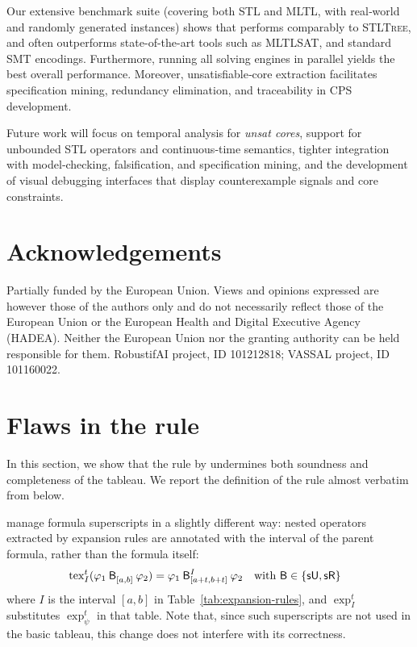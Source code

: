 \documentclass{easychair}
\begin{document}
Our extensive benchmark suite (covering both STL and MLTL, with real‑world and randomly generated instances) shows that \stlsat{} performs comparably to \textsc{STLTree}, and often outperforms state-of-the-art tools such as MLTLSAT, and standard SMT encodings.  
%
Furthermore, running all \stlsat{} solving engines in parallel yields the best overall performance.
Moreover, unsatisfiable‑core extraction facilitates specification mining, redundancy elimination, and traceability in CPS development.

Future work will focus on temporal analysis for \emph{unsat cores}, support for unbounded STL operators and continuous‑time semantics, tighter integration with model‑checking, falsification, and specification mining, and the development of visual debugging interfaces that display counterexample signals and core constraints. 


\section*{Acknowledgements}
Partially funded by the European Union.
Views and opinions expressed are however those of the authors only and do not necessarily reflect those of the European Union or the European Health and Digital Executive Agency (HADEA).
Neither the European Union nor the granting authority can be held responsible for them. RobustifAI project, ID 101212818; VASSAL project, ID 101160022.





\appendix

\section{Flaws in the \texorpdfstring{\oldjump{}}{JUMPO} rule}
\label{app:jump-flaws}

In this section, we show that the \oldjump{} rule by \citet{MelaniBC25} undermines both soundness and completeness of the tableau.
We report the definition of the \oldjump{} rule almost verbatim from \cite{MelaniBC25} below.

\citet{MelaniBC25} manage formula superscripts in a slightly different way:
nested operators extracted by expansion rules are annotated with the interval of the parent formula, rather than the formula itself:
\begin{align*}
&\exp^t_I(\anybinop{[a,b]}{\varphi_1}{\varphi_2}) = \anybinop[I]{[a+t,b+t]}{\varphi_1}{\varphi_2} && \text{with } \mathsf{B} \in \set{\suntilop, \sreleaseop}
\end{align*}
where $I$ is the interval $[a,b]$ in Table~\ref{tab:expansion-rules},
and $\exp^t_I$ substitutes $\exp^t_\psi$ in that table.
Note that, since such superscripts are not used in the basic tableau, this change does not interfere with its correctness.
\end{document}
